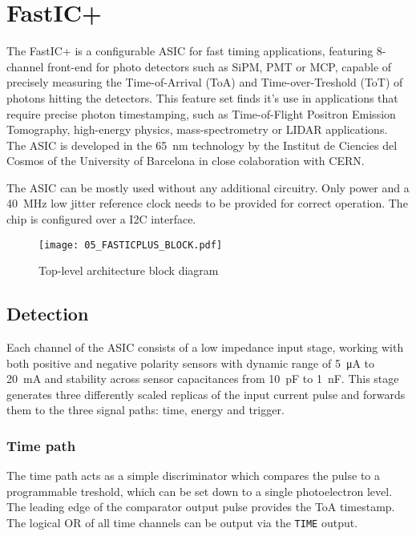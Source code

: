 \chapter{FastIC+}
\label{sec:fastic}
The FastIC+ is a configurable ASIC for fast timing applications, featuring 8-channel front-end for photo detectors such as SiPM, PMT or MCP, capable of precisely measuring the Time-of-Arrival (ToA) and Time-over-Treshold (ToT) of photons hitting the detectors. This feature set finds it's use in applications that require precise photon timestamping, such as Time-of-Flight Positron Emission Tomography, high-energy physics, mass-spectrometry or LIDAR applications. The ASIC is developed in the \SI{65}{\nano\meter} technology by the Institut de Ciencies del Cosmos of the University of Barcelona in close colaboration with CERN. 

The ASIC can be mostly used without any additional circuitry. Only power and a \SI{40}{\mega\hertz} low jitter reference clock needs to be provided for correct operation. The chip is configured over a I2C interface.

\FloatBarrier
\begin{figure}[htp!]
    \centering
    \texttt{[image: 05\_FASTICPLUS\_BLOCK.pdf]}
    \caption{Top-level architecture block diagram}
    \label{fig:fastic_top_level}
\end{figure}
\FloatBarrier



\section{Detection}
Each channel of the ASIC consists of a low impedance input stage, working with both positive and negative polarity sensors with dynamic range of \SI{5}{\micro\ampere} to \SI{20}{\milli\ampere} and stability across sensor capacitances from \SI{10}{\pico\farad} to \SI{1}{\nano\farad}. This stage generates three differently scaled replicas of the input current pulse and forwards them to the three signal paths: time, energy and trigger.
%
\subsection{Time path}
The time path acts as a simple discriminator which compares the pulse to a programmable treshold, which can be set down to a single photoelectron level. The leading edge of the comparator output pulse provides the ToA timestamp. The logical OR of all time channels can be output via the \verb|TIME| output. 
%

